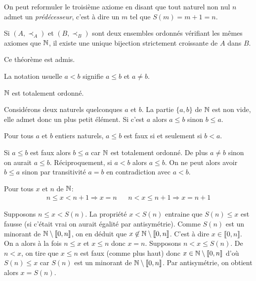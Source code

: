 On peut reformuler le troisième axiome en disant que tout naturel non nul $n$ admet un \emph{prédécesseur}, c'est à dire un $m$ tel que $S(m)=m+1=n$.

\begin{thmn}["unicité" de $\N$]\label{pN: UniN}
 Si $(A,\prec_A)$ et $(B,\prec_B)$ sont deux ensembles ordonnés vérifiant les mêmes axiomes que $\N$,  il existe une unique bijection strictement croissante de $A$ dans $B$.
\end{thmn}
\begin{demo}
 Ce théorème est admis.
\end{demo}

La notation usuelle $a<b$ signifie $a\leq b$ et $a\neq b$. 

\begin{prop}[\ref{pN: TotOrd}]
 $\N$ est totalement ordonné.
\end{prop}
\begin{demo}
 Considérons deux naturels quelconques $a$ et $b$. La partie $\{a,b\}$ de $\N$ est non vide, elle admet donc un plus petit élément. Si c'est $a$ alors $a\leq b$ sinon $b\leq a$.
\end{demo}


\begin{prop}[\ref{pN: cnsa<b}]
 Pour tous $a$ et $b$ entiers naturels, $a\leq b$ est faux si et seulement si $b<a$.
\end{prop}
\begin{demo}
 Si $a\leq b$ est faux alors $b\leq a$ car $\N$ est totalement ordonné. De plus $a\neq b$ sinon on aurait $a\leq b$.\newline
Réciproquement, si $a<b$ alors $a\leq b$. On ne peut alors avoir $b\leq a$ sinon par transitivité $a=b$ en contradiction avec $a<b$.
\end{demo}

\begin{prop}[\ref{pN: Enc}]
  Pour tous $x$ et $n$ de $\N$:
\begin{align*}
 n \leq x < n+1 \Rightarrow x=n & & n < x \leq n+1 \Rightarrow x = n+1
\end{align*}
\end{prop}
\begin{demo}
 Supposons $n\leq x < S(n)$. La propriété $x<S(n)$ entraine que $S(n)\leq x$ est fausse (si c'était vrai on aurait égalité par antisymétrie). Comme $S(n)$ est un minorant de $\mathbb{N}\setminus \llbracket 0, n\rrbracket$, on en déduit que $x\not \in \mathbb{N}\setminus \llbracket 0, n\rrbracket$. C'est à dire $x\in \llbracket 0, n\rrbracket$. On a alors à la fois $n\leq x$ et $x\leq n$ donc $x=n$.\newline
Supposons $n< x \leq S(n)$. De $n<x$, on tire que $x\leq n$ est faux (comme plus haut) donc $x\in \mathbb{N} \setminus \llbracket 0, n\rrbracket$ d'où $S(n) \leq x$ car $S(n)$ est un minorant de $\mathbb{N} \setminus \llbracket 0, n\rrbracket$. Par antisymétrie, on obtient alors $x=S(n)$. 
\end{demo}

